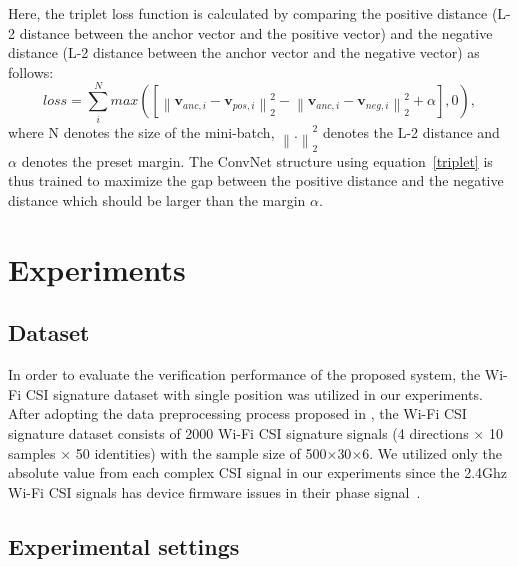 \documentclass[runningheads]{llncs}
\begin{document}
Here, the triplet loss function is calculated by comparing the positive distance (L-2 distance between the anchor vector and the positive vector) and the negative distance (L-2 distance between the anchor vector and the negative vector) as follows:
\begin{equation}
    loss = \sum_i^N max\left({ \left[ {\left\| {{\mathbf{v}_{anc,i}} - {\mathbf{v}_{pos,i}}} \right\|_2^2} - {\left\| {{\mathbf{v}_{anc,i}} - {\mathbf{v}_{neg,i}}} \right\|_2^2}  + \alpha \right]}, 0 \right),\label{triplet}
\end{equation} 
where N denotes the size of the mini-batch, ${\left\| . \right\|_2^2}$ denotes the L-2 distance and $\alpha$ denotes the preset margin.
The ConvNet structure using equation~\eqref{triplet} is thus trained to maximize the gap between the positive distance and the negative distance which should be larger than the margin $\alpha$.

\section{Experiments}

\subsection{Dataset}
 In order to evaluate the verification performance of the proposed system, the Wi-Fi CSI signature dataset \cite{moon2017air} with single position was utilized in our experiments. After adopting the data preprocessing process proposed in \cite{moon2017air}, the Wi-Fi CSI signature dataset consists of 2000 Wi-Fi CSI signature signals (4 directions $\times$ 10 samples $\times$ 50 identities) with the sample size of 500$\times$30$\times$6. We utilized only the absolute value from each complex CSI signal in our experiments since the 2.4Ghz Wi-Fi CSI signals has device firmware issues in their phase signal~\cite{wang2015understanding}.

\subsection{Experimental settings}
\end{document}
